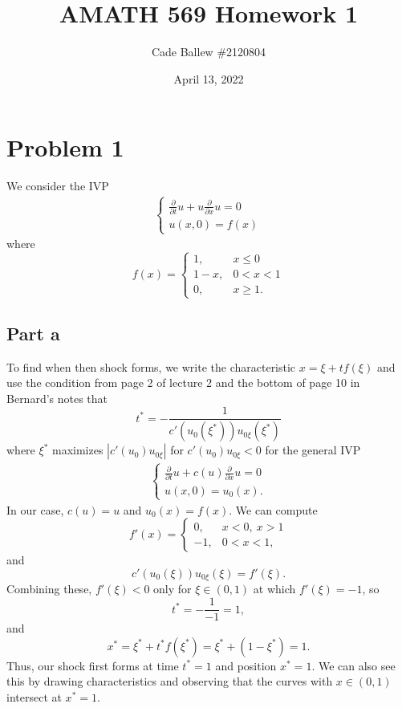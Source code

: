 \documentclass{article}
\title{AMATH 569 Homework 1}
\author{Cade Ballew \#2120804}
\date{April 13, 2022}
\begin{document}
	
\maketitle
	
\section{Problem 1}
We consider the IVP 
\begin{align*}
\begin{cases}
	\frac{\partial }{\partial t}u+u\frac{\partial }{\partial x}u=0\\
	u(x,0)=f(x)
\end{cases}
\end{align*}
where
\[
f(x)=\begin{cases}
	1, &x\leq0\\
	1-x, &0<x<1\\
	0, &x\geq1.
\end{cases}
\]

\subsection{Part a}
To find when then shock forms, we write the characteristic $x=\xi+tf(\xi)$ and use the condition from page 2 of lecture 2 and the bottom of page 10 in Bernard's notes that
\[
t^*=-\frac{1}{c'(u_0(\xi^*))u_{0\xi}(\xi^*)}
\]
where $\xi^*$ maximizes $|c'(u_0)u_{0\xi}|$ for $c'(u_0)u_{0\xi}<0$ for the general IVP
\begin{align*}
	\begin{cases}
		\frac{\partial }{\partial t}u+c(u)\frac{\partial }{\partial x}u=0\\
		u(x,0)=u_0(x).
	\end{cases}
\end{align*}
In our case, $c(u)=u$ and $u_0(x)=f(x)$. We can compute
\[
f'(x)=\begin{cases}
	0, &x<0,~x>1\\
	-1, &0<x<1,
\end{cases}
\]
and
\[
c'(u_0(\xi))u_{0\xi}(\xi)=f'(\xi).
\]
Combining these, $f'(\xi)<0$ only for $\xi\in(0,1)$ at which $f'(\xi)=-1$, so 
\[
t^*=-\frac{1}{-1}=1,
\]
and 
\[
x^*=\xi^*+t^*f(\xi^*)=\xi^*+(1-\xi^*)=1.
\]
Thus, our shock first forms at time $t^*=1$ and position $x^*=1$. We can also see this by drawing characteristics and observing that the curves with $x\in(0,1)$ intersect at $x^*=1$.
\end{document}
